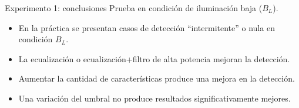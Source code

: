 \begin{frame}{Experimento 1: conclusiones}
Prueba en condición de iluminación baja ($B_{L}$).
 \begin{itemize}
    \item En la práctica se presentan casos de detección ``intermitente'' o nula en condición $B_{L}$.
  \end{itemize}
   
  \begin{itemize}
    \item La ecualización o ecualización+filtro de alta potencia mejoran la detección.
    \item Aumentar la cantidad de características produce una mejora en la detección. 
    \item Una variación del umbral no produce resultados significativamente mejores. 
  \end{itemize}
\end{frame}

